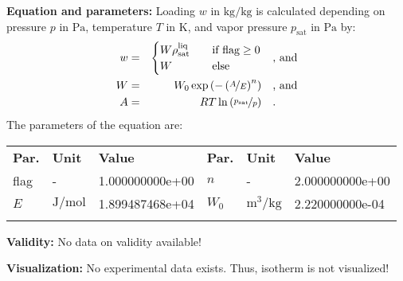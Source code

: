 \textbf{Equation and parameters:}
\newline
%
Loading $w$ in $\si{\kilogram\per\kilogram}$ is calculated depending on pressure $p$ in $\si{\pascal}$, temperature $T$ in $\si{\kelvin}$, and vapor pressure $p_\mathrm{sat}$ in $\si{\pascal}$ by:
%
\begin{equation*}
\begin{split}
w &=& \begin{cases} W \rho_\mathrm{sat}^{\mathrm{liq}} & \quad \text{if flag} \geq 0 \\ W & \quad \text{else} \end{cases} & \quad\text{, and} \\
W &=& W_0 \exp \left( - \left( \nicefrac{A}{E} \right) ^{n} \right) & \quad\text{, and} \\
A &=& R T \ln \left( \nicefrac{p_\mathrm{sat}}{p} \right) & \quad\text{.} \\
\end{split}
\end{equation*}
%
The parameters of the equation are:
%
\begin{longtable}[l]{lll|lll}
\toprule
\addlinespace
\textbf{Par.} & \textbf{Unit} & \textbf{Value} &	\textbf{Par.} & \textbf{Unit} & \textbf{Value} \\
\addlinespace
\midrule
\endhead

\bottomrule
\endfoot
\bottomrule
\endlastfoot
\addlinespace

flag & - & 1.000000000e+00 & $n$ & - & 2.000000000e+00 \\
$E$ & $\si{\joule\per\mole}$ & 1.899487468e+04 & $W_0$ & $\si{\cubic\meter\per\kilogram}$ & 2.220000000e-04 \\

\addlinespace\end{longtable}

\textbf{Validity:}
\newline
No data on validity available!
\newline

\textbf{Visualization:}
%
\newline
No experimental data exists. Thus, isotherm is not visualized!
%

\FloatBarrier
\newpage
